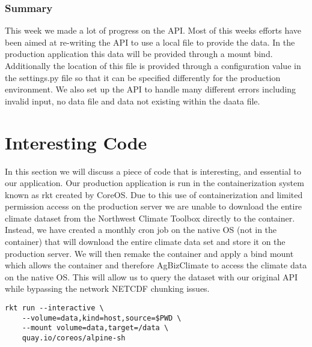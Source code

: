\documentclass[onecolumn, draftclsnofoot,10pt, compsoc]{article}
\begin{document}
			\subsubsection{Summary} This week we made a lot of progress on the API. Most of this weeks efforts have been aimed at re-writing the API to use a local file to provide the data. In the production application this data will be provided through a mount bind. Additionally the location of this file is provided through a configuration value in the settings.py file so that it can be specified differently for the production environment. We also set up the API to handle many different errors including invalid input, no data file and data not existing within the daata file.\\
			
\section{Interesting Code}
In this section we will discuss  a piece of code that is interesting, and essential to our application. Our production application is run in the containerization system known as rkt created by CoreOS. Due to this use of containerization and limited permission access on the production server we are unable to download the entire climate dataset from the Northwest Climate Toolbox directly to the container. Instead, we have created a monthly cron job on the native OS (not in the container) that will download the entire climate data set and store it on the production server. We will then remake the container and apply a bind mount which allows the container and therefore AgBizClimate to access the climate data on the native OS. This will allow us to query the dataset with our original API while bypassing the network NETCDF chunking issues.

\begin{verbatim}
rkt run --interactive \
    --volume=data,kind=host,source=$PWD \
    --mount volume=data,target=/data \
    quay.io/coreos/alpine-sh
\end{verbatim}
\end{document}
